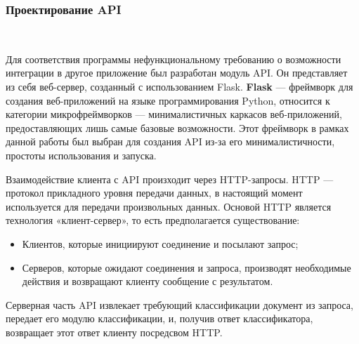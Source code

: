 \newpage
\subsubsection{Проектирование API}
\

Для соответствия программы нефункциональному требованию о возможности интеграции в другое приложение был разработан модуль API. Он представляет из себя веб-сервер, созданный с использованием Flask. \textbf{Flask} — фреймворк для создания веб-приложений на языке программирования Python, относится к категории микрофреймворков — минималистичных каркасов веб-приложений, предоставляющих лишь самые базовые возможности\cite{Flask}. Этот фреймворк в рамках данной работы был выбран для создания API из-за его минималистичности, простоты использования и запуска. 

Взаимодействие клиента с API произходит через HTTP-запросы. HTTP — протокол прикладного уровня передачи данных, в настоящий момент используется для передачи произвольных данных. Основой HTTP является технология «клиент-сервер», то есть предполагается существование:

\begin{itemize}
  \item Клиентов, которые инициируют соединение и посылают запрос;
  \item Серверов, которые ожидают соединения и запроса, производят необходимые действия и возвращают клиенту сообщение с результатом. 
\end{itemize}

Серверная часть API извлекает требующий классификации документ из запроса, передает его модулю классификации, и, получив ответ классификатора, возвращает этот ответ клиенту посредсвом HTTP.
\newpage